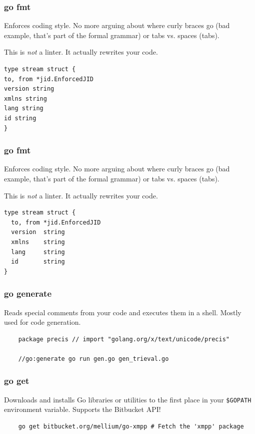 \documentclass[xelatex,aspectratio=169]{beamer}
\begin{document}
\begin{frame}[fragile]
	\frametitle{go fmt}
	\begin{flushleft}
		Enforces coding style. No more arguing about where curly braces go (bad
		example, that's part of the formal grammar) or tabs vs. spaces (tabs).
	\end{flushleft}
	\begin{flushleft}
		This is \emph{not} a linter. It actually rewrites your code.
	\end{flushleft}
\begin{verbatim}
type stream struct {
to, from *jid.EnforcedJID
version string
xmlns string
lang string
id string
}
\end{verbatim}
\end{frame}
\begin{frame}[fragile]
	\frametitle{go fmt}
	\begin{flushleft}
		Enforces coding style. No more arguing about where curly braces go (bad
		example, that's part of the formal grammar) or tabs vs. spaces (tabs).
	\end{flushleft}
	\begin{flushleft}
		This is \emph{not} a linter. It actually rewrites your code.
	\end{flushleft}
\begin{verbatim}
type stream struct {
  to, from *jid.EnforcedJID
  version  string
  xmlns    string
  lang     string
  id       string
}
\end{verbatim}
\end{frame}

\begin{frame}[fragile]
	\frametitle{go generate}
	\begin{flushleft}
		Reads special comments from your code and executes them in a shell. Mostly
		used for code generation.
	\end{flushleft}
\begin{verbatim}
	package precis // import "golang.org/x/text/unicode/precis"

	//go:generate go run gen.go gen_trieval.go
\end{verbatim}
\end{frame}

\begin{frame}[fragile]
	\frametitle{go get}
	\begin{flushleft}
		Downloads and installs Go libraries or utilities to the first place in your
		\texttt{\$GOPATH} environment variable. Supports the Bitbucket API!
	\end{flushleft}
\begin{verbatim}
	go get bitbucket.org/mellium/go-xmpp # Fetch the 'xmpp' package
\end{verbatim}
\end{frame}
\end{document}

